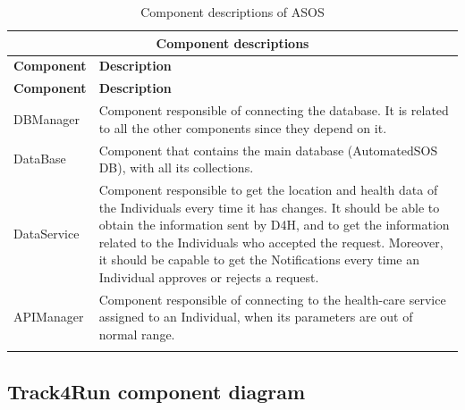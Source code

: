 \documentclass[a4paper, hidelinks, 12pt]{report}
\begin{document}
		\begin{longtable}{l p{}}
			\hline\hline
			\multicolumn{2}{c}{\textbf{Component descriptions}} \\
			\hline
			\textbf{Component} & \textbf{Description} \\ [0.5ex]
			\hline
			\endfirsthead
			\hline
			\textbf{Component} & \textbf{Description} \\ [0.5ex]
			\hline
			\endhead
			DBManager & Component responsible of connecting the database. It is related to all the other components since they depend on it.\\
			DataBase & Component that contains the main database (AutomatedSOS DB), with all its collections.\\
			DataService & Component responsible to get the location and health data of the Individuals every time it has changes. It should be able to obtain the information sent by D4H, and to get the information related to the Individuals who accepted the request. Moreover, it should be capable to get the Notifications every time an Individual approves or rejects a request.\\
			APIManager & Component responsible of connecting to the health-care service assigned to an Individual, when its parameters are out of normal range.\\
			\hline
			\caption{Component descriptions of ASOS}
			\label{table:asos_component_descriptions}
		\end{longtable}
		
	\subsection{Track4Run component diagram}
\end{document}
